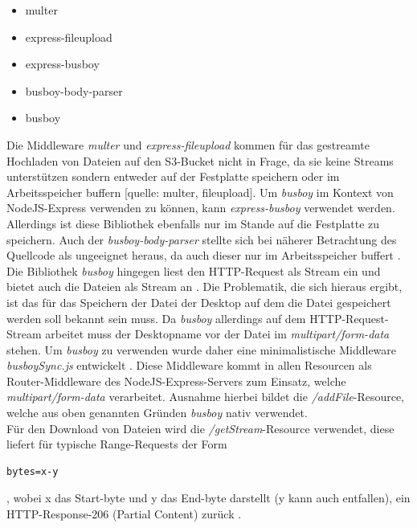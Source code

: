 \documentclass[a4paper, 12pt]{scrreprt}
\renewcommand\_{\textunderscore\allowbreak}
\begin{document}
\begin{itemize}
\item multer
\item express-fileupload
\item express-busboy
\item busboy-body-parser
\item busboy
\end{itemize}


\noindent Die Middleware \textit{multer} und \textit{express-fileupload} kommen für das gestreamte Hochladen von Dateien auf den S3-Bucket nicht in Frage, da sie keine Streams unterstützen sondern entweder auf der Festplatte speichern  oder im Arbeitsspeicher buffern [quelle: multer, fileupload].
Um \textit{busboy} im Kontext von NodeJS-Express verwenden zu können, kann \textit{express-busboy} verwendet werden. Allerdings ist diese Bibliothek ebenfalls nur im Stande auf die Festplatte zu speichern. Auch der \textit{busboy-body-parser} stellte sich bei näherer Betrachtung des Quellcode als ungeeignet heraus, da auch dieser nur im Arbeitsspeicher buffert \cite{LeonardMartin}.\\
Die Bibliothek \textit{busboy} hingegen liest den HTTP-Request als Stream ein und bietet auch die Dateien als Stream an \cite{busboy}.
Die Problematik, die sich hieraus ergibt, ist das für das Speichern der Datei der Desktop auf dem die Datei gespeichert werden soll bekannt sein muss. Da \textit{busboy} allerdings auf dem HTTP-Request-Stream arbeitet muss der Desktopname vor der Datei im \textit{multipart/form-data} stehen. Um \textit{busboy} zu verwenden wurde daher eine minimalistische Middleware \textit{busboySync.js} entwickelt \cite{Express}.
Diese Middleware kommt in allen Resourcen als Router-Middleware des NodeJS-Express-Servers zum Einsatz, welche \textit{multipart/form-data} verarbeitet. Ausnahme hierbei bildet die \textit{/addFile}-Resource, welche aus oben genannten Gründen \textit{busboy} nativ verwendet.\\
Für den Download von Dateien wird die \textit{/getStream}-Resource verwendet, diese liefert für typische Range-Requests der Form
\begin{lstlisting}
bytes=x-y
\end{lstlisting}
, wobei x das Start-byte und y das End-byte darstellt (y kann auch entfallen), ein HTTP-Response-206 (Partial Content) zurück \cite{HTP}.
\end{document}
